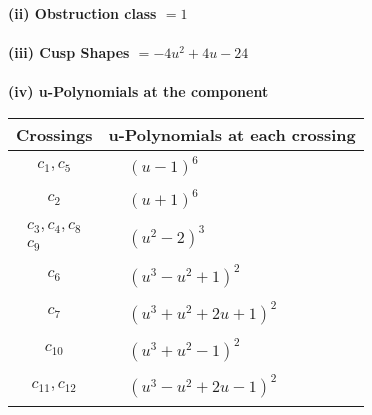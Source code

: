 \documentclass[1p]{elsarticle_modified}
\theoremstyle{definition}
\begin{document}
\flushleft \textbf{(ii) Obstruction class $= 1$}\\~\\
\flushleft \textbf{(iii) Cusp Shapes $= -4 u^2+4 u-24$}\\~\\
\newpage\renewcommand{\arraystretch}{1}
\flushleft \textbf{(iv) u-Polynomials at the component}\newline \\
\begin{tabular}{m{50pt}|m{274pt}}
Crossings & \hspace{64pt}u-Polynomials at each crossing \\
\hline $$\begin{aligned}c_{1},c_{5}\end{aligned}$$&$\begin{aligned}
&(u-1)^6
\end{aligned}$\\
\hline $$\begin{aligned}c_{2}\end{aligned}$$&$\begin{aligned}
&(u+1)^6
\end{aligned}$\\
\hline $$\begin{aligned}c_{3},c_{4},c_{8}\\c_{9}\end{aligned}$$&$\begin{aligned}
&(u^2-2)^3
\end{aligned}$\\
\hline $$\begin{aligned}c_{6}\end{aligned}$$&$\begin{aligned}
&(u^3- u^2+1)^2
\end{aligned}$\\
\hline $$\begin{aligned}c_{7}\end{aligned}$$&$\begin{aligned}
&(u^3+u^2+2 u+1)^2
\end{aligned}$\\
\hline $$\begin{aligned}c_{10}\end{aligned}$$&$\begin{aligned}
&(u^3+u^2-1)^2
\end{aligned}$\\
\hline $$\begin{aligned}c_{11},c_{12}\end{aligned}$$&$\begin{aligned}
&(u^3- u^2+2 u-1)^2
\end{aligned}$\\
\hline
\end{tabular}\\~\\
\end{document}
